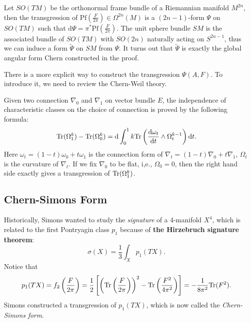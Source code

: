 \begin{remark}
    Let $SO(TM)$ be the orthonormal frame bundle of a Riemannian manifold $M^{2n}$, 
    then the transgression of $\mathrm{Pf}\left(\frac{F}{2\pi}\right)\in \Omega^{2n}(M)$ is 
    a $(2n-1)$-form $\Psi$ on $SO(TM)$ such that $\mathrm{d}\Psi = \pi^* \mathrm{Pf}\left(\frac{F}{2\pi}\right)$.
    The unit sphere bundle $SM$ is the associated bundle of $SO(TM)$ with $SO(2n)$ naturally acting on $S^{2n-1}$, 
    thus we can induce a form $\tilde{\Psi}$ on $SM$ from $\Psi$. 
    It turns out that $\tilde{\Psi}$ is exactly the global angular form Chern constructed in the proof.
\end{remark}

There is a more explicit way to construct the transgression $\Psi(A,F)$. 
To introduce it, we need to review the Chern-Weil theory. 

Given two connection $\nabla_0$ and $\nabla_1$ on vector bundle $E$, 
the independence of characteristic classes on the choice of connection is proved by the following formula:
\begin{equation*}
    {\rm Tr}(\Omega_1^k) - {\rm Tr}(\Omega_0^k) 
    = {\rm d}\int_0^1 k{\rm Tr}\left(\frac{\mathrm{d} \omega_t}{\mathrm{d} t}\wedge\Omega_t^{k-1}\right) {\rm d} t. 
\end{equation*}
Here $\omega_t = (1-t)\omega_0 + t\omega_1$ is the connection form of $\nabla_t = (1-t)\nabla_0 + t\nabla_1$,
$\Omega_t$ is the curvature of $\nabla_t$. 
If we fix $\nabla_0$ to be flat, i,e., $\Omega_0 = 0$, 
then the right hand side exactly gives a transgression of ${\rm Tr}(\Omega_1^k)$.

\subsection{Chern-Simons Form}
Historically, Simons wanted to study the \emph{signature} of a 4-manifold $X^4$, 
which is related to the first Pontryagin class $p_1$ 
because of \textbf{the Hirzebruch signature theorem}:
\begin{equation*}
    \sigma(X) = \frac{1}{3}\int_X p_1(TX).
\end{equation*}
Notice that 
\begin{equation*}
    p_1(TX) = f_2\left(\frac{F}{2\pi}\right) 
    = \frac{1}{2}\left[\left({\rm Tr}\left(\frac{F}{2\pi}\right)\right)^2
    -{\rm Tr}\left(\frac{F^2}{4\pi^2}\right)\right] 
    = -\frac{1}{8\pi^2}{\rm Tr}(F^2).
\end{equation*}
Simons constructed a transgression of $p_1(TX)$, which is now called the \emph{Chern-Simons form}. 

